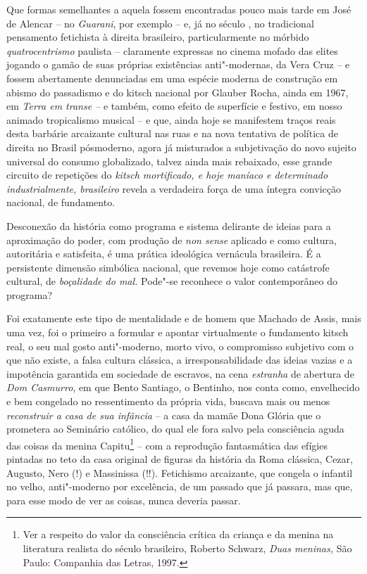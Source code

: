 Que formas semelhantes a aquela fossem encontradas pouco mais tarde em
José de Alencar -- no \emph{Guarani}, por exemplo -- e, já no século ,
no tradicional pensamento fetichista à direita brasileiro,
particularmente no mórbido \emph{quatrocentrismo} paulista -- claramente
expressas no cinema mofado das elites jogando o gamão de suas próprias
existências anti"-modernas, da Vera Cruz -- e fossem abertamente
denunciadas em uma espécie moderna de construção em abismo do passadismo
e do kitsch nacional por Glauber Rocha, ainda em 1967, em \emph{Terra em
transe --} e também, como efeito de superfície e festivo, em nosso
animado tropicalismo musical -- e que, ainda hoje se manifestem traços
reais desta barbárie arcaizante cultural nas ruas e na nova tentativa de
política de direita no Brasil pósmoderno, agora já misturados a
subjetivação do novo sujeito universal do consumo globalizado, talvez
ainda mais rebaixado, esse grande circuito de repetições do \emph{kitsch
mortificado, e hoje maníaco e determinado industrialmente, brasileiro}
revela a verdadeira força de uma íntegra convicção nacional, de
fundamento.

Desconexão da história como programa e sistema delirante de ideias para
a aproximação do poder, com produção de \emph{non sense} aplicado e como
cultura, autoritária e satisfeita, é uma prática ideológica vernácula
brasileira. É a persistente dimensão simbólica nacional, que revemos
hoje como catástrofe cultural, de \emph{boçalidade do mal.} Pode"-se
reconhece o valor contemporâneo do programa?

Foi exatamente este tipo de mentalidade e de homem que Machado de Assis,
mais uma vez, foi o primeiro a formular e apontar virtualmente o
fundamento kitsch real, o seu mal gosto anti"-moderno, morto vivo, o
compromisso subjetivo com o que não existe, a falsa cultura clássica, a
irresponsabilidade das ideias vazias e a impotência garantida em
sociedade de escravos, na cena \emph{estranha} de abertura de \emph{Dom
Casmurro}, em que Bento Santiago, o Bentinho, nos conta como,
envelhecido e bem congelado no ressentimento da própria vida, buscava
mais ou menos \emph{reconstruir a casa de sua infância} -- a casa da
mamãe Dona Glória que o prometera ao Seminário católico, do qual ele
fora salvo pela consciência aguda das coisas da menina Capitu\footnote{Ver
  a respeito do valor da consciência crítica da criança e da menina na
  literatura realista do século  brasileiro, Roberto Schwarz,
  \emph{Duas meninas,} São Paulo: Companhia das Letras, 1997.} -- com a
reprodução fantasmática das efígies pintadas no teto da casa original de
figuras da história da Roma clássica, Cezar, Augusto, Nero (!) e
Massinissa (!!). Fetichismo arcaizante, que congela o infantil no velho,
anti"-moderno por excelência, de um passado que já passara, mas que, para
esse modo de ver as coisas, nunca deveria passar.

